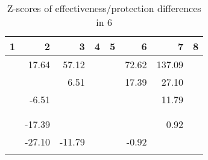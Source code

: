 \begin{table}[ht]
\centering
\begin{tabular}{rrrrrrrr}
  \hline
1 & 2 & 3 & 4 & 5 & 6 & 7 & 8 \\ 
  \hline
 & 17.64 & 57.12 &  &  & 72.62 & 137.09 &  \\ 
   &  & 6.51 &  &  & 17.39 & 27.10 &  \\ 
   & -6.51 &  &  &  &  & 11.79 &  \\ 
   &  &  &  &  &  &  &  \\ 
   &  &  &  &  &  &  &  \\ 
   & -17.39 &  &  &  &  & 0.92 &  \\ 
   & -27.10 & -11.79 &  &  & -0.92 &  &  \\ 
   &  &  &  &  &  &  &  \\ 
   \hline
\end{tabular}
\caption{Z-scores of effectiveness/protection differences in  6} 
\end{table}
